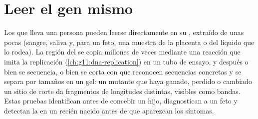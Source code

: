 \section{Leer el gen mismo}

\begin{proposition}\label{prop:g11:genes-and-disease:testing}
Los  que lleva una persona pueden leerse directamente en su ,
extraído de unas pocas  (sangre, saliva y, para un feto, una
muestra de la placenta o del líquido que lo rodea). La región del 
se copia millones de veces mediante una reacción que imita la
replicación (\cref{ch:g11:dna-replication}) en un tubo de ensayo, y
después o bien se secuencia, o bien se corta con  que reconocen
secuencias concretas y se separa por tamaños en un gel: un 
mutante que haya ganado, perdido o cambiado un sitio de corte da
fragmentos de longitudes distintas, visibles como bandas. Estas
pruebas identifican  antes de concebir un hijo, diagnostican
a un feto y detectan la  en un recién nacido antes de que
aparezcan los síntomas.
\end{proposition}
\admitted


